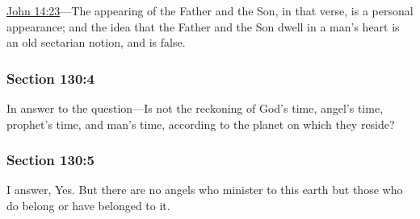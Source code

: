 		\hyperref[JOHN-14-23]{John 14:23}---The appearing of the Father and the Son, in that verse, is a personal appearance; and the idea that the Father and the Son dwell in a man's heart is an old sectarian notion, and is false.


	\subsubsection{Section 130:4} %
		\label{DC130-4}

		In answer to the question---Is not the reckoning of God's time, angel's time, prophet's time, and man's time, according to the planet on which they reside?


	\subsubsection{Section 130:5} %
		\label{DC130-5}

		I answer, Yes. But there are no angels who minister to this earth but those who do belong or have belonged to it.


